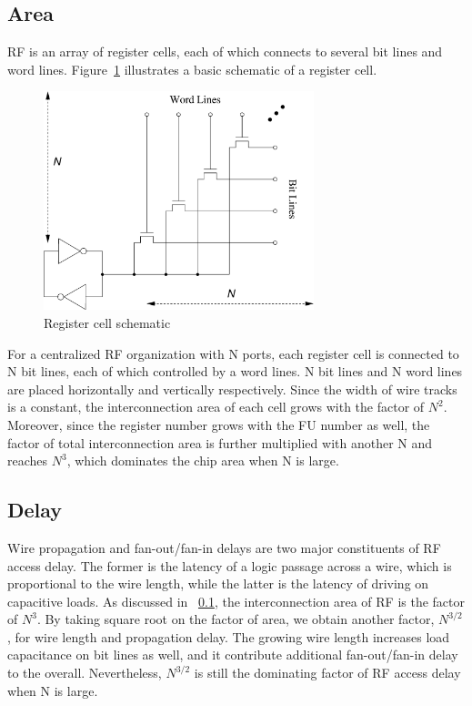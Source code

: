     \subsection{Area}
    \label{sec:area}
    RF is an array of register cells, each of which connects to several bit lines and word lines.
    Figure~\ref{fig:rf} illustrates a basic schematic of a register cell.
        \vspace{\textfig}
        \begin{figure}[!ht] 
            \centering
            \includegraphics[width=0.7\textwidth]{./figs/rf.eps}
            \caption{Register cell schematic}
            \label{fig:rf}
        \end{figure}
    For a centralized RF organization with N ports, 
    each register cell is connected to N bit lines, each of which controlled by a word lines.
    N bit lines and N word lines are placed horizontally and vertically respectively.
    Since the width of wire tracks is a constant, 
    the interconnection area of each cell grows with the factor of $N^2$.
    Moreover, since the register number grows with the FU number as well,
    the factor of total interconnection area is further multiplied with another N and reaches $N^3$,  
    which dominates the chip area when N is large.
    \subsection{Delay}
    Wire propagation and fan-out/fan-in delays are two major constituents of RF access delay.
    The former is the latency of a logic passage across a wire,
    which is proportional to the wire length, 
    while the latter is the latency of driving on capacitive loads.
    As discussed in ~\ref{sec:area}, the interconnection area of RF is the factor of $N^3$.
    By taking square root on the factor of area, 
    we obtain another factor, $N^{3/2}$, for wire length and propagation delay.
    The growing wire length increases load capacitance on bit lines as well, 
    and it contribute additional fan-out/fan-in delay to the overall.
    Nevertheless, $N^{3/2}$ is still the dominating factor of RF access delay when N is large.
